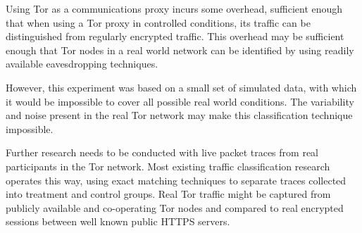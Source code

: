 \documentclass[conference]{IEEEtran}
\begin{document}
Using Tor as a communications proxy incurs some overhead, sufficient enough
that when using a Tor proxy in controlled conditions, its traffic can be
distinguished from regularly encrypted traffic. This overhead may be sufficient
enough that Tor nodes in a real world network can be identified by using
readily available eavesdropping techniques.

However, this experiment was based on a small set of simulated data, with which
it would be impossible to cover all possible real world conditions. The
variability and noise present in the real Tor network may make this
classification technique impossible.

Further research needs to be conducted with live packet traces from real
participants in the Tor network. Most existing traffic classification research
operates this way, using exact matching techniques to separate traces collected
into treatment and control groups. Real Tor traffic might be captured from
publicly available and co-operating Tor nodes and compared to real encrypted
sessions between well known public HTTPS servers.

\printbibliography
\end{document}
